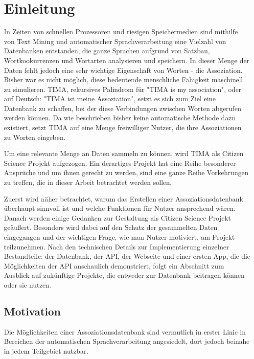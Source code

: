 \chapter{Einleitung}

In Zeiten von schnellen Prozessoren und riesigen Speichermedien sind mithilfe von Text Mining und automatischer Sprachverarbeitung eine Vielzahl von Datenbanken entstanden, die ganze Sprachen aufgrund von Satzbau, Wortkookurrenzen und Wortarten analysieren und speichern. In dieser Menge der Daten fehlt jedoch eine sehr wichtige Eigenschaft von Worten - die Assoziation. Bisher war es nicht möglich, diese bedeutende menschliche Fähigkeit maschinell zu simulieren. TIMA, rekursives Palindrom für "TIMA is my association", oder auf Deutsch: "TIMA ist meine Assoziation", setzt es sich zum Ziel eine Datenbank zu schaffen, bei der diese Verbindungen zwischen Worten abgerufen werden können. Da wie beschrieben bisher keine automatische Methode dazu existiert, setzt TIMA auf eine Menge freiwilliger Nutzer, die ihre Assoziationen zu Worten eingeben.

Um eine relevante Menge an Daten sammeln zu können, wird TIMA als Citizen Science Projekt aufgezogen. Ein derartiges Projekt hat eine Reihe besonderer Ansprüche und um ihnen gerecht zu werden, sind eine ganze Reihe Vorkehrungen zu treffen, die in dieser Arbeit betrachtet werden sollen.

Zuerst wird näher betrachtet, warum das Erstellen einer Assoziationsdatenbank überhaupt sinnvoll ist und welche Funktionen für Nutzer ansprechend wären. Danach werden einige Gedanken zur Gestaltung  als Citizen Science Projekt geäußert. Besonders wird dabei auf den Schutz der gesammelten Daten eingegangen und der wichtigen Frage, wie man Nutzer motiviert, am Projekt teilzunehmen. Nach den technischen Details zur Implementierung einzelner Bestandteile: der Datenbank, der API, der Webseite und einer ersten App, die die Möglichkeiten der API anschaulich demonstriert, folgt ein Abschnitt zum Ausblick auf zukünftige Projekte, die entweder zur Datenbank beitragen können oder sie nutzen.


\section{Motivation}
Die Möglichkeiten einer Assoziationsdatenbank sind vermutlich in erster Linie in Bereichen der automatischen Sprachverarbeitung angesiedelt, dort jedoch beinahe in jedem Teilgebiet nutzbar.


